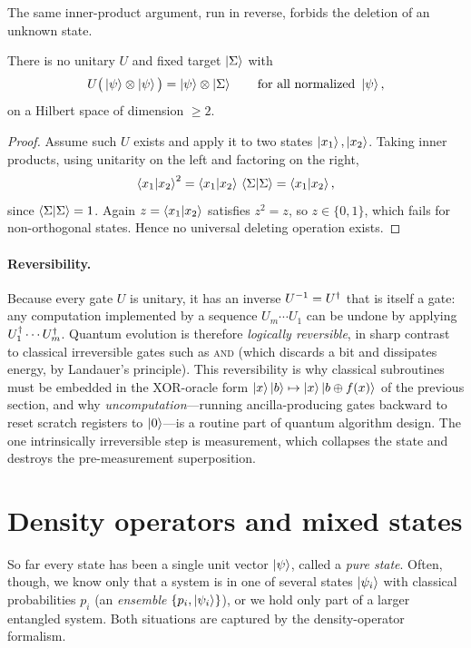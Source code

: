 The same inner-product argument, run in reverse, forbids the deletion of an unknown
state.

\begin{theorem}\label{thm:lec01-nodeleting}
There is no unitary $U$ and fixed target $\ket{\Sigma}$ with
\[
  U\big(\ket{\psi}\otimes\ket{\psi}\big)=\ket{\psi}\otimes\ket{\Sigma}
  \qquad\text{for all normalized } \ket{\psi},
\]
on a Hilbert space of dimension $\geq 2$.
\end{theorem}

\begin{proof}
Assume such $U$ exists and apply it to two states $\ket{x_{1}},\ket{x_{2}}$. Taking
inner products, using unitarity on the left and factoring on the right,
\[
  \braket{x_{1}|x_{2}}^{2}=\braket{x_{1}|x_{2}}\,\braket{\Sigma|\Sigma}
                          =\braket{x_{1}|x_{2}},
\]
since $\braket{\Sigma|\Sigma}=1$. Again $z=\braket{x_{1}|x_{2}}$ satisfies $z^{2}=z$,
so $z\in\{0,1\}$, which fails for non-orthogonal states. Hence no universal deleting
operation exists.
\end{proof}

\paragraph{Reversibility.} Because every gate $U$ is unitary, it has an inverse
$U^{-1}=U^{\dagger}$ that is itself a gate: any computation implemented by a sequence
$U_m\cdots U_1$ can be undone by applying $U_1^{\dagger}\cdots U_m^{\dagger}$. Quantum evolution is
therefore \emph{logically reversible}, in sharp contrast to classical irreversible
gates such as \textsc{and} (which discards a bit and dissipates energy, by Landauer's
principle). This reversibility is why classical subroutines must be embedded in the
XOR-oracle form $\ket{x}\ket{b}\mapsto\ket{x}\ket{b\oplus f(x)}$ of the previous
section, and why \emph{uncomputation}---running ancilla-producing gates backward to
reset scratch registers to $\ket{0}$---is a routine part of quantum algorithm design.
The one intrinsically irreversible step is measurement, which collapses the state and
destroys the pre-measurement superposition.

\section{Density operators and mixed states}
\label{sec:lec01-5}

So far every state has been a single unit vector $\ket{\psi}$, called a \emph{pure
state}. Often, though, we know only that a system is in one of several states
$\ket{\psi_i}$ with classical probabilities $p_i$ (an \emph{ensemble}
$\{p_i,\ket{\psi_i}\}$), or we hold only part of a larger entangled system. Both
situations are captured by the density-operator formalism.

